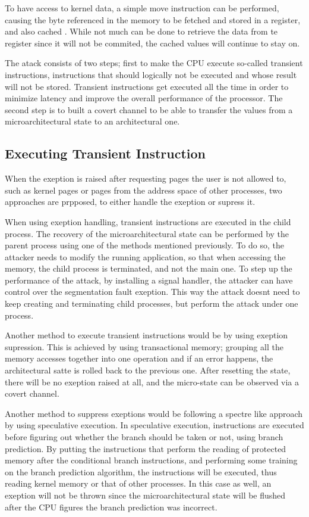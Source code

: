 \documentclass[sigconf]{acmart}
\begin{document}
To have access to kernel data, a simple move instruction can be performed, causing the byte referenced in the memory to be fetched and stored in a register, and also cached . While not much can be done to retrieve the data from te register since it will not be commited, the cached values will continue to stay on.

The atack consists of two steps; first to make the CPU execute so-called transient instructions, instructions that should logically not be executed and whose result will not be stored. Transient instructions get executed all the time in order to minimize latency and improve the overall performance of the processor. 
The second step is to built a covert channel to be able to transfer the values from a microarchitectural state to an architectural one. 

\subsection{Executing Transient Instruction}
When the exeption is raised after requesting pages the user is not allowed to, such as kernel pages or pages from the address space of other processes, two approaches are prpposed, to either handle the exeption or supress it. 

When using exeption handling, transient instructions are executed in the child process. The recovery of the microarchitectural state can be performed by the parent process using one of the methods mentioned previously. 
To do so, the attacker needs to modify the running application, so that when accessing the memory, the child process is terminated, and not the main one. 
To step up the performance of the attack, by installing a signal handler, the attacker can have control over the segmentation fault exeption. This way the attack doesnt need to keep creating and terminating child processes, but perform the attack under one process. 

Another method to execute transient instructions would be by using exeption supression. This is achieved by using transactional memory; grouping all the memory accesses together into one operation and if an error happens, the architectural satte is rolled back to the previous one. After resetting the state, there will be no exeption raised at all, and the micro-state can be observed via a covert channel. 

Another method to suppress exeptions would be following a spectre \cite{} like approach by using speculative execution. In speculative execution, instructions are executed before figuring out whether the branch should be taken or not, using branch prediction. By putting the instructions that perform the reading of protected memory after the conditional branch instructions, and performing some training on the branch prediction algorithm, the instructions will be executed, thus reading kernel memory or that of other processes. In this case as well, an exeption will not be thrown since the microarchitectural state will be flushed after the CPU figures the branch prediction was incorrect. 
\end{document}
